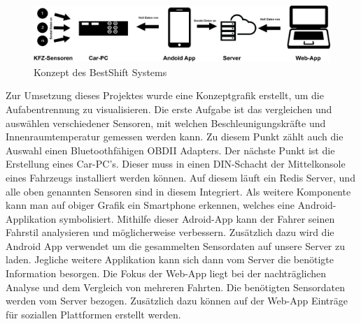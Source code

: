 
\begin{figure}[!htb]
	\centering
	\includegraphics[scale=0.6]{images/konzept}
	\caption{Konzept des BestShift Systems}
\end{figure}

Zur Umsetzung dieses Projektes wurde eine Konzeptgrafik erstellt, um die Aufabentrennung zu visualisieren.
\nextline
Die erste Aufgabe ist das vergleichen und auswählen verschiedener Sensoren, mit welchen Beschleunigungskräfte und Innenraumtemperatur gemessen werden kann. Zu diesem Punkt zählt auch die Auswahl einen Bluetoothfähigen OBDII Adapters.
\nextline
Der nächste Punkt ist die Erstellung eines Car-PC's. Dieser muss in einen DIN-Schacht der Mittelkonsole eines Fahrzeugs installiert werden können. Auf diesem läuft ein Redis Server, und alle oben genannten Sensoren sind in diesem Integriert.
\nextline
Als weitere Komponente kann man auf obiger Grafik ein Smartphone erkennen, welches eine Android-Applikation symbolisiert. Mithilfe dieser Adroid-App kann der Fahrer seinen Fahrstil analysieren und möglicherweise verbessern.
\nextline
Zusätzlich dazu wird die Android App verwendet um die gesammelten Sensordaten auf unsere Server zu laden. Jegliche weitere Applikation kann sich dann vom Server die benötigte Information besorgen.
\nextline
Die Fokus der Web-App liegt bei der nachträglichen Analyse und dem Vergleich von mehreren Fahrten. Die benötigten Sensordaten werden vom Server bezogen. Zusätzlich dazu können auf der Web-App Einträge für soziallen Plattformen erstellt werden.